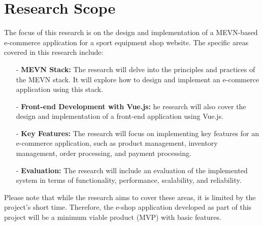 \section{Research Scope}
The focus of this research is on the design and implementation of a MEVN-based e-commerce application for a sport equipment shop website.
The specific areas covered in this research include:
\begin{itemize}
    \item[-] \textbf{MEVN Stack:} The research will delve into the principles and practices of the MEVN stack. It will explore how to design and implement an e-commerce application using this stack.
    \item[-] \textbf{Front-end Development with Vue.js: } he research will also cover the design and implementation of a front-end application using Vue.js.
    \item[-] \textbf{Key Features: } The research will focus on implementing key features for an e-commerce application, such as product management, inventory management, order processing, and payment processing.
    \item[-] \textbf{Evaluation:} The research will include an evaluation of the implemented system in terms of functionality, performance, scalability, and reliability.
\end{itemize}

Please note that while the research aims to cover these areas, it is limited by the project's short time. Therefore, the e-shop application developed as part of this project will be a minimum viable product (MVP) with basic features.
